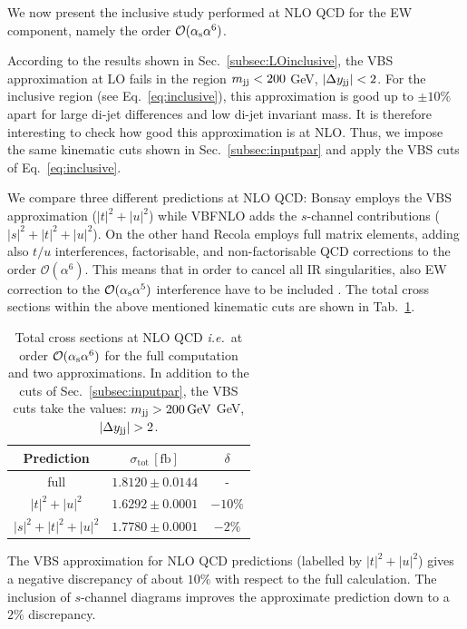 We now present the inclusive study performed at NLO QCD for the EW component, namely the order $\mathcal{O}(\alpha_\text{s}\alpha^6)$.

According to the results shown in Sec.~\ref{subsec:LOinclusive}, the VBS approximation at LO fails in the region $m_{\text{j}\text{j}} < 200$ GeV, $|\Delta y_{\text{j}\text{j}}| < 2$.
For the inclusive region (see Eq.~\eqref{eq:inclusive}), this approximation is good up to $\pm10\%$ apart for large di-jet differences and low di-jet invariant mass.
It is therefore interesting to check how good this approximation is at NLO.
Thus, we impose the same kinematic cuts shown in Sec.~\ref{subsec:inputpar} and apply the VBS cuts of Eq.~\eqref{eq:inclusive}.

We compare three different predictions at NLO QCD: {\sc Bonsay} employs the VBS approximation ($|t|^2+|u|^2$) while {\sc VBFNLO} adds the $s$-channel contributions ($|s|^2+|t|^2+|u|^2$).
On the other hand {\sc Recola} employs full matrix elements, adding also $t/u$ interferences, factorisable, and non-factorisable QCD corrections to the order $\mathcal{O}(\alpha^6)$.
This means that in order to cancel all IR singularities, also EW correction to the $\mathcal{O}(\alpha_\text{s}\alpha^5)$ interference have to be included \cite{Biedermann:2016yds}.
The total cross sections within the above mentioned kinematic cuts are shown in Tab.~\ref{tab:crosssecINCLUSIVE}.

\begin{table}[h!]
\centering
\begin{tabular}{c|c|c}
Prediction & $\sigma_{\textrm{tot}}\,[\textrm{fb}]$ & $\delta$ \\
\hline
\hline
full &  $1.8120 \pm 0.0144$ & - \\
\hline
$|t|^2 + |u|^2$ & $1.6292 \pm 0.0001$  &  $-10\%$ \\
\hline
$|s|^2 + |t|^2 + |u|^2$ & $1.7780 \pm 0.0001$  & $-2\%$
\end{tabular}
\caption{\label{tab:crosssecINCLUSIVE} Total cross sections at NLO QCD \emph{i.e.}\ at order $\mathcal{O}(\alpha_\text{s}\alpha^6)$ for the full computation and two approximations.
In addition to the cuts of Sec.~\ref{subsec:inputpar}, the VBS cuts take the values: $m_{\text{j}\text{j}}>200 \,\text{GeV}$ GeV, $|\Delta y_{\Pj\Pj}|>2$.}
\end{table}

The VBS approximation for NLO QCD predictions (labelled by $|t|^2 + |u|^2$) gives a negative discrepancy of about $10\%$ with respect to the full calculation.
The inclusion of $s$-channel diagrams improves the approximate prediction down to a $2\%$ discrepancy.


